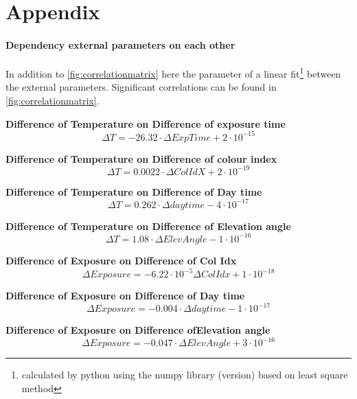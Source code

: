 \documentclass  [
  paper    = a4,
  BCOR     = 10mm,
  twoside,
  fontsize = 12pt,
  fleqn,
  toc      = bibnumbered,
  toc      = listofnumbered,
  numbers  = noendperiod,
  headings = normal,
  listof   = leveldown,
  version  = 3.03
]                                       {scrreprt}
\begin{document}
\part{Appendix}
\begin{appendix}
	\subsection*{Dependency external parameters on each other}
	In addition to \cref{fig:correlationmatrix} here the parameter of a linear fit\footnote{calculated by python using the numpy library (version) based on least square method} between the external parameters. Significant correlations can be found in \cref{fig:correlationmatrix}.
	
	\textbf{Difference of Temperature on  Difference of exposure time}
	\begin{equation}
	\Delta T =  -26.32\cdot \Delta ExpTime + 2\cdot 10^{-15}
	\end{equation}
	
	\textbf{Difference of Temperature on  Difference of colour index}
	\begin{equation}
	\Delta T = 0.0022\cdot \Delta ColIdX +2\cdot 10^{-19}
	\end{equation}
	
	\textbf{Difference of Temperature on  Difference of Day time}
	\begin{equation}
	\Delta T =0.262\cdot \Delta daytime -4\cdot 10^{-17}
	\end{equation}
	
	\textbf{Difference of Temperature on  Difference of Elevation angle}
	\begin{equation}
	\Delta T =1.08\cdot \Delta Elev Angle -1\cdot 10^{-16}
	\end{equation}
	
	\textbf{Difference of Exposure on  Difference of  Col Idx}
	\begin{equation}
	\Delta Exposure  =-6.22\cdot 10^{-5} \Delta Col Idx  +1\cdot 10^{-18}
	\end{equation}
	
	\textbf{Difference of  Exposure on  Difference of Day time}
	\begin{equation}
	\Delta Exposure  =-0.004\cdot \Delta daytime -1\cdot 10^{-17}
	\end{equation}
	
	\textbf{Difference of  Exposure  on  Difference ofElevation angle}
	\begin{equation}
	\Delta Exposure  =-0.047\cdot \Delta  ElevAngle +3\cdot 10^{-16}
	\end{equation}
	

\end{appendix}
\end{document}
